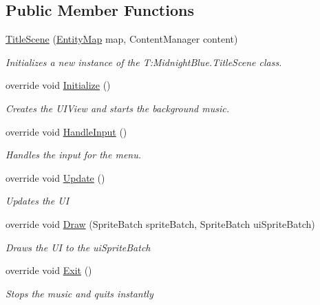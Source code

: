 \subsection*{Public Member Functions}
\begin{DoxyCompactItemize}
\item 
\hyperlink{class_midnight_blue_1_1_title_scene_a409eb89a58dbec10d5a0002ce78bc9a3}{Title\+Scene} (\hyperlink{class_midnight_blue_1_1_engine_1_1_entity_component_1_1_entity_map}{Entity\+Map} map, Content\+Manager content)
\begin{DoxyCompactList}\small\item\em Initializes a new instance of the T\+:\+Midnight\+Blue.\+Title\+Scene class. \end{DoxyCompactList}\item 
override void \hyperlink{class_midnight_blue_1_1_title_scene_a793aa8253fba8d62a4ee19f042b22891}{Initialize} ()
\begin{DoxyCompactList}\small\item\em Creates the U\+I\+View and starts the background music. \end{DoxyCompactList}\item 
override void \hyperlink{class_midnight_blue_1_1_title_scene_a54dc02f150eb90dac2fcc6e37a077723}{Handle\+Input} ()
\begin{DoxyCompactList}\small\item\em Handles the input for the menu. \end{DoxyCompactList}\item 
override void \hyperlink{class_midnight_blue_1_1_title_scene_a4052b2a261434462cd0150e2f4da3c5b}{Update} ()
\begin{DoxyCompactList}\small\item\em Updates the UI \end{DoxyCompactList}\item 
override void \hyperlink{class_midnight_blue_1_1_title_scene_a03fa806a36226ec5fd0ce09870109c18}{Draw} (Sprite\+Batch sprite\+Batch, Sprite\+Batch ui\+Sprite\+Batch)
\begin{DoxyCompactList}\small\item\em Draws the UI to the ui\+Sprite\+Batch \end{DoxyCompactList}\item 
override void \hyperlink{class_midnight_blue_1_1_title_scene_aed29e37e9f849cc8f8443bae057a8eb8}{Exit} ()
\begin{DoxyCompactList}\small\item\em Stops the music and quits instantly \end{DoxyCompactList}\item 

\end{DoxyCompactItemize}
